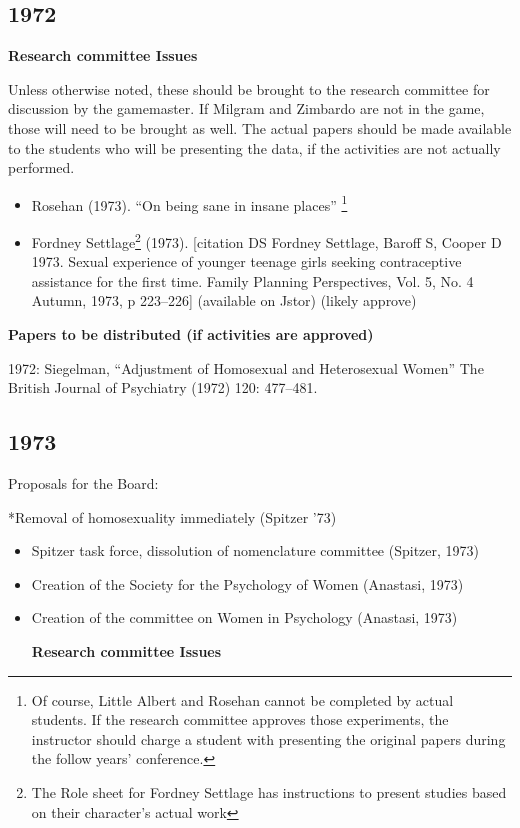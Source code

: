 \newpage

\subsection{1972}
\label{1972}

\textbf{Research committee Issues}

Unless otherwise noted, these should be brought to the research committee for discussion by the gamemaster. If Milgram and Zimbardo are not in the game, those will need to be brought as well. The actual papers should be made available to the students who will be presenting the data, if the activities are not actually performed.

\begin{itemize}
\item Rosehan (1973). ``On being sane in insane places'' \footnote{Of course, Little Albert and Rosehan cannot be completed by actual students. If the research committee approves those experiments, the instructor should charge a student with presenting the original papers during the follow years' conference.}

\item Fordney Settlage\footnote{The Role sheet for Fordney Settlage has instructions to present studies based on their character's actual work} (1973). [citation DS Fordney Settlage, Baroff S, Cooper D 1973. Sexual experience of younger teenage girls seeking contraceptive assistance for the first time. Family Planning Perspectives, Vol. 5, No. 4 Autumn, 1973, p 223--226] (available on Jstor) (likely approve)

\end{itemize}

\textbf{Papers to be distributed (if activities are approved)}

1972: Siegelman, ``Adjustment of Homosexual and Heterosexual Women'' The British Journal of Psychiatry (1972) 120: 477--481.

\newpage

\subsection{1973}
\label{1973}

Proposals for the Board:

*Removal of homosexuality immediately (Spitzer '73)

\begin{itemize}
\item Spitzer task force, dissolution of nomenclature committee (Spitzer, 1973)

\item Creation of the Society for the Psychology of Women (Anastasi, 1973)

\item Creation of the committee on Women in Psychology (Anastasi, 1973)

\textbf{Research committee Issues}

\end{itemize}

